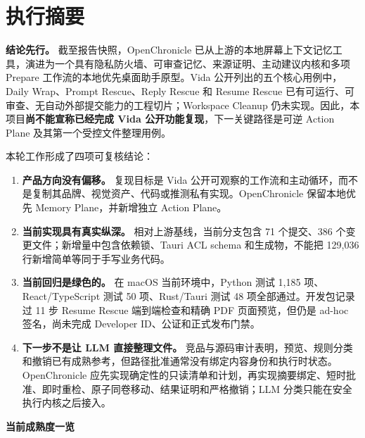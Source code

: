 \documentclass[UTF8,fontset=none,zihao=-4,openany]{ctexrep}
\begin{document}
\chapter*{执行摘要}

\begin{executivebox}
\textbf{结论先行。} 截至报告快照，OpenChronicle 已从上游的本地屏幕上下文记忆工具，演进为一个具有隐私防火墙、可审查记忆、来源证明、主动建议内核和多项 Prepare 工作流的本地优先桌面助手原型。Vida 公开列出的五个核心用例中，Daily Wrap、Prompt Rescue、Reply Rescue 和 Resume Rescue 已有可运行、可审查、无自动外部提交能力的工程切片；Workspace Cleanup 仍未实现。因此，本项目\textbf{尚不能宣称已经完成 Vida 公开功能复现}，下一关键路径是可逆 Action Plane 及其第一个受控文件整理用例。
\end{executivebox}

本轮工作形成了四项可复核结论：

\begin{enumerate}
  \item \textbf{产品方向没有偏移。} 复现目标是 Vida 公开可观察的工作流和主动循环，而不是复制其品牌、视觉资产、代码或推测私有实现。OpenChronicle 保留本地优先 Memory Plane，并新增独立 Action Plane。
  \item \textbf{当前实现具有真实纵深。} 相对上游基线，当前分支包含 71 个提交、386 个变更文件；新增量中包含依赖锁、Tauri ACL schema 和生成物，不能把 129,036 行新增简单等同于手写业务代码。
  \item \textbf{当前回归是绿色的。} 在 macOS 当前环境中，Python 测试 1,185 项、React/TypeScript 测试 50 项、Rust/Tauri 测试 48 项全部通过。开发包记录过 11 步 Resume Rescue 端到端检查和精确 PDF 页面预览，但仍是 ad-hoc 签名，尚未完成 Developer ID、公证和正式发布门禁。
  \item \textbf{下一步不是让 LLM 直接整理文件。} 竞品与源码审计表明，预览、规则分类和撤销已有成熟参考，但路径批准通常没有绑定内容身份和执行时状态。OpenChronicle 应先实现确定性的只读清单和计划，再实现摘要绑定、短时批准、即时重检、原子同卷移动、结果证明和严格撤销；LLM 分类只能在安全执行内核之后接入。
\end{enumerate}

\vspace{2mm}
\noindent\textbf{当前成熟度一览}
\end{document}
